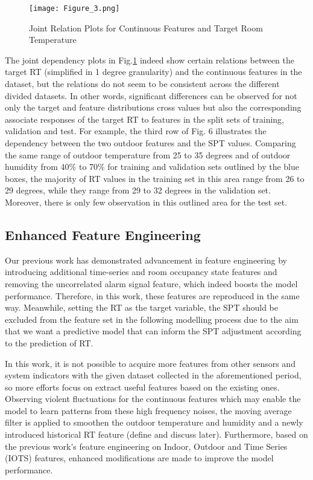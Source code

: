 \documentclass[11pt]{article}
\begin{document}
    \begin{figure}[htbp]
    	\centering
    	\texttt{[image: Figure\_3.png]}
        \caption{Joint Relation Plots for Continuous Features and Target Room Temperature}
        \label{TargetFeature}
    \end{figure}
    
    The joint dependency plots in Fig.\ref{TargetFeature} indeed show certain relations between the target RT (simplified in 1 degree granularity) and the continuous features in the dataset, but the relations do not seem to be consistent across the different divided datasets. In other words, significant differences can be observed for not only the target and feature distributions cross values but also the corresponding associate responses of the target RT to features in the split sets of training, validation and test. For example, the third row of Fig. 6 illustrates the dependency between the two outdoor features and the SPT values. Comparing the same range of outdoor temperature from 25 to 35 degrees and of outdoor humidity from 40\% to 70\% for training and validation sets outlined by the blue boxes, the majority of RT values in the training set in this area range from 26 to 29 degrees, while they range from 29 to 32 degrees in the validation set. Moreover, there is only few observation in this outlined area for the test set.
    
    \subsection{Enhanced Feature Engineering}
    
    Our previous work has demonstrated advancement in feature engineering by introducing additional time-series and room occupancy state features and removing the uncorrelated alarm signal feature, which indeed boosts the model performance. Therefore, in this work, these features are reproduced in the same way. Meanwhile, setting the RT as the target variable, the SPT should be excluded from the feature set in the following modelling process due to the aim that we want a predictive model that can inform the SPT adjustment according to the prediction of RT.
    
    In this work, it is not possible to acquire more features from other sensors and system indicators with the given dataset collected in the aforementioned period, so more efforts focus on extract useful features based on the existing ones. Observing violent fluctuations for the continuous features which may enable the model to learn patterns from these high frequency noises, the moving average filter is applied to smoothen the outdoor temperature and humidity and a newly introduced historical RT feature (define and discuss later). Furthermore, based on the previous work’s feature engineering on Indoor, Outdoor and Time Series (IOTS) features, enhanced modifications are made to improve the model performance.
    
\end{document}
